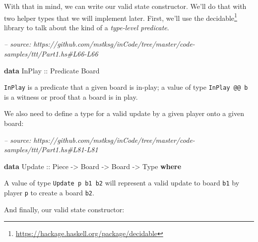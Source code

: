 \documentclass[]{article}
\newenvironment{Shaded}{}{}
\newcommand{\CommentTok}[1]{\textcolor[rgb]{0.38,0.63,0.69}{\textit{#1}}}
\newcommand{\DataTypeTok}[1]{\textcolor[rgb]{0.56,0.13,0.00}{#1}}
\newcommand{\KeywordTok}[1]{\textcolor[rgb]{0.00,0.44,0.13}{\textbf{#1}}}
\newcommand{\OtherTok}[1]{\textcolor[rgb]{0.00,0.44,0.13}{#1}}
\renewcommand{\href}[2]{#2\footnote{\url{#1}}}
\begin{document}
With that in mind, we can write our valid state constructor. We'll do that with
two helper types that we will implement later. First, we'll use the
\href{https://hackage.haskell.org/package/decidable}{decidable} library to talk
about the kind of a \emph{type-level predicate}.

\begin{Shaded}
\begin{Highlighting}[]
\CommentTok{-- source: https://github.com/mstksg/inCode/tree/master/code-samples/ttt/Part1.hs#L66-L66}

\KeywordTok{data} \DataTypeTok{InPlay}\OtherTok{ ::} \DataTypeTok{Predicate} \DataTypeTok{Board}
\end{Highlighting}
\end{Shaded}

\texttt{InPlay} is a predicate that a given board is in-play; a value of type
\texttt{InPlay\ @@\ b} is a witness or proof that a board is in play.

We also need to define a type for a valid update by a given player onto a given
board:

\begin{Shaded}
\begin{Highlighting}[]
\CommentTok{-- source: https://github.com/mstksg/inCode/tree/master/code-samples/ttt/Part1.hs#L81-L81}

\KeywordTok{data} \DataTypeTok{Update}\OtherTok{ ::} \DataTypeTok{Piece} \OtherTok{->} \DataTypeTok{Board} \OtherTok{->} \DataTypeTok{Board} \OtherTok{->} \DataTypeTok{Type} \KeywordTok{where}
\end{Highlighting}
\end{Shaded}

A value of type \texttt{Update\ p\ b1\ b2} will represent a valid update to
board \texttt{b1} by player \texttt{p} to create a board \texttt{b2}.

And finally, our valid state constructor:
\end{document}
